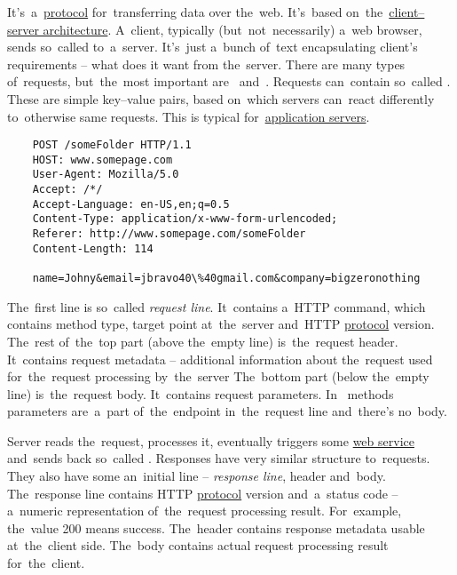 \label{networkprotocols}

\label{tcp}

\label{ip}

\label{http}
It's~a~\hyperref[protocolstandard]{protocol} for~transferring data over the~web.
It's~based on~the~\hyperref[clientserverarchitecture]{client--server architecture}.
A~client, typically (but~not~necessarily) a~web browser, sends so~called  to~a~server.
It's~just a~bunch of~text encapsulating client's requirements -- what does it want from the~server.
There are many types of~requests, but~the~most important are~ and~.
Requests can~contain so~called .
These are simple key--value pairs, based on~which servers can~react differently to~otherwise same requests.
This is typical for~\hyperref[applicationserver]{application servers}.

\begin{lstlisting}
    POST /someFolder HTTP/1.1
    HOST: www.somepage.com
    User-Agent: Mozilla/5.0
    Accept: /*/
    Accept-Language: en-US,en;q=0.5
    Content-Type: application/x-www-form-urlencoded;
    Referer: http://www.somepage.com/someFolder
    Content-Length: 114

    name=Johny&email=jbravo40\%40gmail.com&company=bigzeronothing
\end{lstlisting}

\noindent The~first line is so~called \textit{request line}.
It~contains a~HTTP command, which contains method type, target point at~the~server and~HTTP \hyperref[protocolstandard]{protocol} version.
The~rest of~the~top part (above the~empty line) is~the~request header.
It~contains request metadata -- additional information about the~request used for~the~request processing by~the~server
The~bottom part (below the~empty line) is~the~request body.
It~contains request parameters.
In~ methods parameters are~a~part of~the~endpoint in~the~request line and~there's no~body.

Server reads the~request, processes it, eventually triggers some \hyperref[webserviceapplication]{web service} and~sends back so~called .
Responses have very similar structure to~requests.
They also have some an~initial line -- \textit{response line}, header and~body.
The~response line contains HTTP \hyperref[protocolstandard]{protocol} version and~a~status code --  a~numeric representation of~the~request processing result.
For~example, the~value 200 means success.
The~header contains response metadata usable at~the~client side.
The~body contains actual request processing result for~the~client.

